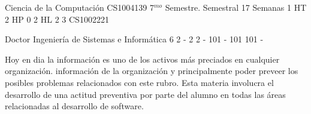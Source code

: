 \documentclass[a4paper,8pt]{article}
\begin{document}
\setNombreProfesor{}
\setGradoProfesorAbreviado{}
\sylabusHeader

\academicaTable
{Ciencia de la Computación} %
{CS1004139} %
{7$^{mo}$ Semestre.} %
{Semestral} %
{17 Semanas} %
{1 HT} %
{2 HP} %
{0} %
{2 HL}  %
{2} %
{3} %
{CS1002221} %

\administrativaTable
{Doctor} %
{Ingeniería de Sistemas e Informática} %
{6} %
{2} %
{-} %
{2} %
{2} %
{-} %
{101} %
{-} %
{101} %
{101} %
{-} %


\begin{fundamentacion}
Hoy en dia la información es uno de los activos más preciados en cualquier organización.
información de la organización y principalmente poder preveer los posibles problemas relacionados con este rubro.
Esta materia involucra el desarrollo de una actitud preventiva por parte del alumno en todas las áreas
relacionadas al desarrollo de software.

\end{fundamentacion}

\begin{sumilla}
\item \IASFoundationalConceptsinSecurity
\item \IASPrinciplesofSecureDesign
\item \IASDefensiveProgramming
\item \IASThreatsandAttacks
\item \IASNetworkSecurity
\item \IASCryptography
\item \IASWebSecurity
\item \IASPlatformSecurity
\item \IASDigitalForensics
\item \IASSecureSoftwareEngineering

\end{sumilla}
\end{document}
